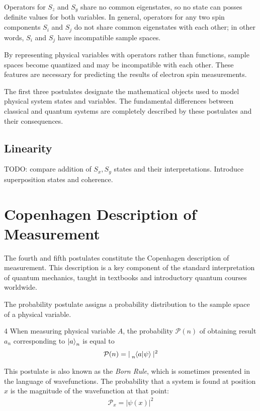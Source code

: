 Operators for $S_z$ and $S_y$ share no common eigenstates, so no state can posses definite values for both variables. In general, operators for any two spin components $S_i$ and $S_j$ do not share common eigenstates with each other; in other words, $S_i$ and $S_j$ have incompatible sample spaces.

By representing physical variables with operators rather than functions, sample spaces become quantized and may be incompatible with each other. These features are necessary for predicting the results of electron spin measurements.

The first three postulates designate the mathematical objects used to model physical system states and variables. The fundamental differences between classical and quantum systems are completely described by these postulates and their consequences.

\subsection{Linearity}
TODO: compare addition of $S_x, S_y$ states and their interpretations. Introduce superposition states and coherence.

\section{Copenhagen Description of Measurement}
The fourth and fifth postulates constitute the Copenhagen description of measurement. This description is a key component of the standard interpretation of quantum mechanics, taught in textbooks and introductory quantum courses worldwide.

The probability postulate assigns a probability distribution to the sample space of a physical variable.

\begin{Thm:Postulate}{4}
    When measuring physical variable $A$, the probability $\mathcal{P}(n)$ of obtaining result $a_n$ corresponding to $\ket{a}_n$  is equal to
     \begin{align}
        \mathcal{P}(n) = |\tensor[_n]{\braket{a|\psi}}{}|^2
    \end{align}
\end{Thm:Postulate}

This postulate is also known as the \textit{Born Rule}, which is sometimes presented in the language of wavefunctions. The probability that a system is found at position $x$ is the magnitude of the wavefunction at that point:
\begin{align}
    \mathcal{P}_x = |\psi(x)|^2
\end{align}

